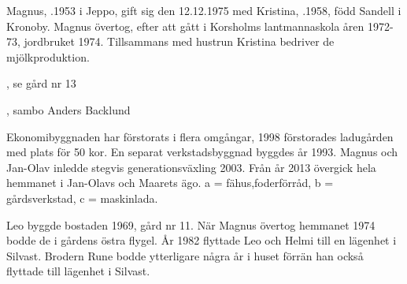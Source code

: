 %
Magnus, .1953 i Jeppo, gift sig den 12.12.1975 med Kristina, .1958, född Sandell i Kronoby. Magnus övertog, efter att gått i Korsholms lantmannaskola åren 1972-73, jordbruket 1974. Tillsammans med hustrun Kristina bedriver de mjölkproduktion.
\begin{jhchildren}
  \item {}, se gård nr 13
  \item {}
  \item {}
  \item {}
  \item {}
  \item {}, sambo Anders Backlund
  \item {}
  \item {}
  \item {}
\end{jhchildren}
Ekonomibyggnaden har förstorats i flera omgångar, 1998 förstorades ladugården med plats för 50 kor. En separat verkstadsbyggnad byggdes år 1993. Magnus och Jan-Olav inledde stegvis generationsväxling 2003. Från år 2013 övergick hela hemmanet i Jan-Olavs och Maarets ägo. a = fähus,foderförråd, b = gårdsverkstad, c = maskinlada.


%
Leo byggde bostaden 1969, gård nr 11. När Magnus övertog hemmanet 1974 bodde de i gårdens östra flygel. År 1982 flyttade Leo och Helmi till en lägenhet i Silvast. Brodern Rune bodde ytterligare några år i huset förrän han också flyttade till lägenhet i Silvast.



%


